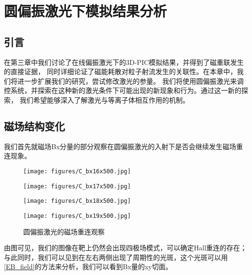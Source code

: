 \chapter{\textbf{圆偏振激光下模拟结果分析}}

\section[\textnormal{引言}]{\textbf{引言}}

在第三章中我们讨论了在线偏振激光下的3D-PIC模拟结果，并得到了磁重联发生的直接证据，
同时详细论证了磁能耗散对粒子射流发生的关联性。在本章中，我们将进一步扩展我们的研究，尝试修改激光的参量。
我们将使用圆偏振激光来调控系统，并探索在这种新的激光条件下可能出现的新现象和行为。通过这一新的探索，
我们希望能够深入了解激光与等离子体相互作用的机制。
\section[\textnormal{磁场结构变化}]{\textbf{磁场结构变化}}

我们首先就磁场Bx分量的部分观察在圆偏振激光的入射下是否会继续发生磁场重连现象。

\begin{figure}[H]
    \begin{minipage}[t]{0.5\linewidth}
        \centering
        \texttt{[image: figures/C\_bx16x500.jpg]}
        \label{fig:side_C_bx:a}
    \end{minipage}%
    \begin{minipage}[t]{0.5\linewidth}
        \centering
        \texttt{[image: figures/C\_bx17x500.jpg]}
        \label{fig:side_C_bx:b}
    \end{minipage}
    \begin{minipage}[t]{0.5\linewidth}
        \centering
        \texttt{[image: figures/C\_bx18x500.jpg]}
        \label{fig:side_C_bx:c}
    \end{minipage}%
    \begin{minipage}[t]{0.5\linewidth}
        \centering
        \texttt{[image: figures/C\_bx19x500.jpg]}
        \label{fig:side_C_bx:d}
    \end{minipage}
    \caption{圆偏振激光的磁场重连观察}
    \label{fig:combined_C_bx}

\end{figure}

由图可见，我们的图像在靶上仍然会出现四极场模式，可以确定Hall重连的存在；
与此同时，我们可以见到在左右两侧出现了周期性的光斑，这个光斑可以用\ref{EB_field}的方法来分析，我们可以看到Bx量的xy切面。

